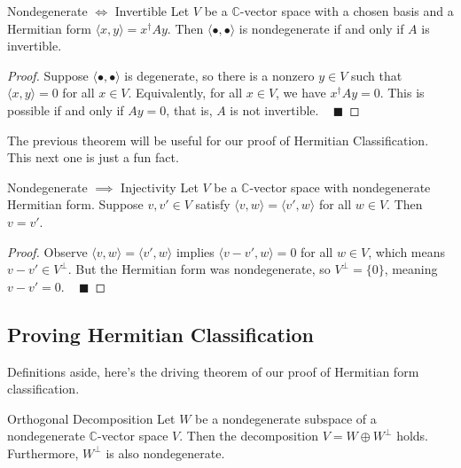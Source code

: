 \begin{theorem}{Nondegenerate $\iff$ Invertible}
    Let $V$ be a $\mathbb{C}$-vector space with a chosen basis and a Hermitian form $\langle x, y \rangle = x^{\dagger}Ay$.  Then $\langle \bullet, \bullet \rangle$ is nondegenerate if and only if $A$ is invertible.
\end{theorem}

\begin{proof}
    Suppose $\langle \bullet, \bullet \rangle$ is degenerate, so there is a nonzero $y \in V$ such that $\langle x, y \rangle = 0$ for all $x \in V$.  Equivalently, for all $x \in V$, we have $x^{\dagger}Ay = 0$.  This is possible if and only if $Ay = 0$, that is, $A$ is not invertible. ~ $\blacksquare$
\end{proof}

The previous theorem will be useful for our proof of Hermitian Classification.  This next one is just a fun fact.

\begin{theorem}{Nondegenerate $\implies$ Injectivity}
    Let $V$ be a $\mathbb{C}$-vector space with nondegenerate Hermitian form.  Suppose $v, v' \in V$ satisfy $\langle v, w \rangle = \langle v', w \rangle$ for all $w \in V$.  Then $v = v'$.
\end{theorem}

\begin{proof}
    Observe $\langle v, w \rangle = \langle v', w \rangle$ implies $\langle v - v', w \rangle = 0$ for all $w \in V$, which means $v - v' \in V^{\perp}$.  But the Hermitian form was nondegenerate, so $V^{\perp} = \{0\}$, meaning $v - v' = 0$. ~ $\blacksquare$
\end{proof}

\subsection{Proving Hermitian Classification}

Definitions aside, here's the driving theorem of our proof of Hermitian form classification.

\begin{theorem}{Orthogonal Decomposition}
    Let $W$ be a nondegenerate subspace of a nondegenerate $\mathbb{C}$-vector space $V$.  Then the decomposition $V = W \oplus W^{\perp}$ holds.  Furthermore, $W^{\perp}$ is also nondegenerate.
\end{theorem}

